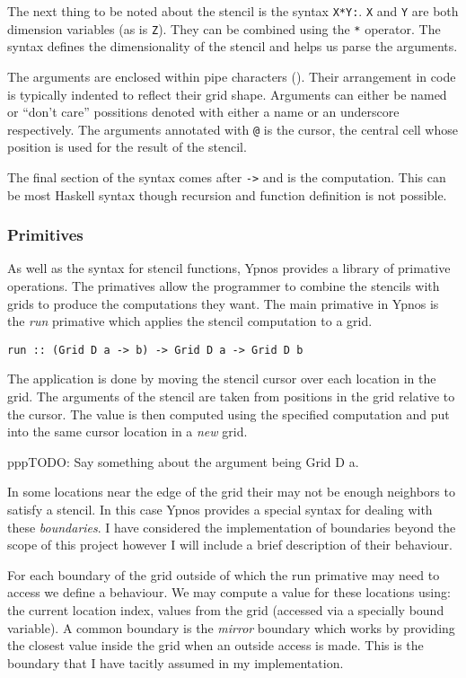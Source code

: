 The next thing to be noted about the stencil is the syntax
\texttt{X*Y:}. \texttt{X} and \texttt{Y} are both dimension variables
(as is \texttt{Z}). They can be combined using the \texttt{*} operator.
The syntax defines the dimensionality of the stencil and helps us parse
the arguments.

The arguments are enclosed within pipe characters (\texttt{\textbar{}}).
Their arrangement in code is typically indented to reflect their grid
shape. Arguments can either be named or ``don't care'' possitions
denoted with either a name or an underscore respectively. The arguments
annotated with \texttt{@} is the cursor, the central cell whose position
is used for the result of the stencil.

The final section of the syntax comes after \texttt{-\textgreater{}} and
is the computation. This can be most Haskell syntax though recursion and
function definition is not possible.

\subsubsection{Primitives}

As well as the syntax for stencil functions, Ypnos provides a library of
primative operations. The primatives allow the programmer to combine the
stencils with grids to produce the computations they want. The main
primative in Ypnos is the \emph{run} primative which applies the stencil
computation to a grid.

\begin{verbatim}
run :: (Grid D a -> b) -> Grid D a -> Grid D b
\end{verbatim}

The application is done by moving the stencil cursor over each location
in the grid. The arguments of the stencil are taken from positions in
the grid relative to the cursor. The value is then computed using the
specified computation and put into the same cursor location in a
\emph{new} grid.

pppTODO: Say something about the argument being Grid D a.

In some locations near the edge of the grid their may not be enough
neighbors to satisfy a stencil. In this case Ypnos provides a special
syntax for dealing with these \emph{boundaries}. I have considered the
implementation of boundaries beyond the scope of this project however I
will include a brief description of their behaviour.

For each boundary of the grid outside of which the run primative may
need to access we define a behaviour. We may compute a value for these
locations using: the current location index, values from the grid
(accessed via a specially bound variable). A common boundary is the
\emph{mirror} boundary which works by providing the closest value inside
the grid when an outside access is made. This is the boundary that I
have tacitly assumed in my implementation.

